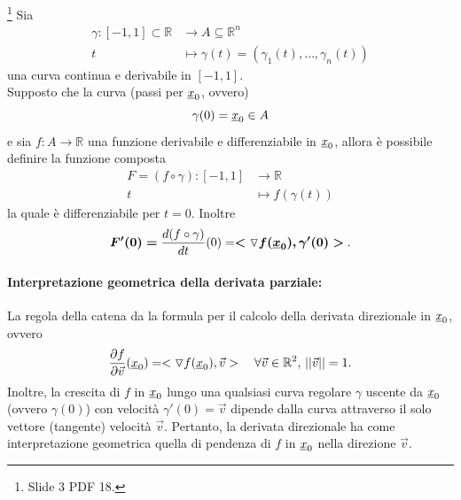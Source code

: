 \begin{theorem}\footnote{Slide 3 PDF 18.}
	Sia
	\begin{equation*}
		\begin{aligned}
			\gamma:[-1,1]\subset\mathbb{R} &\rightarrow A\subseteq\mathbb{R}^n\\
			t&\mapsto \gamma(t)=(\gamma_1(t),\hdots,\gamma_n(t)) 
		\end{aligned}
	\end{equation*}
	una curva continua e derivabile in $[-1,1]$.\\
	Supposto che la curva (passi per $\uline x_0$, ovvero)
	\begin{equation*}
		\gamma(0) = \uline x_0\in A
	\end{equation*}
	e sia $f:A\rightarrow\mathbb{R}$ una funzione derivabile e differenziabile in $\uline x_0$, allora è possibile definire la funzione composta
	\begin{equation*}
		\begin{aligned}
			F=(f \circ \gamma): [-1,1]&\rightarrow\mathbb{R}\\
			t&\mapsto f(\gamma(t))
		\end{aligned}
	\end{equation*}
	la quale è differenziabile per $t=0$. Inoltre
	\begin{equation*}
		\boldsymbol{F'(0)=}\frac{d(f\circ \gamma)}{dt}(0) = \boldsymbol{<\triangledown f(\uline x_0), \gamma'(0)>}.
	\end{equation*}
\end{theorem}

\paragraph{Interpretazione geometrica della derivata parziale:} La regola della catena da la formula per il calcolo della derivata direzionale in $\uline x_0$, ovvero
\begin{equation*}
	\frac{\partial f}{\partial \vec{v}} (\uline x_0)=<\triangledown f(\uline x_0), \vec{v}>\quad \forall\vec{v}\in\mathbb{R}^2,\, ||\vec{v}||=1.
\end{equation*}
Inoltre, la crescita di $f$ in $\uline x_0$ lungo una qualsiasi curva regolare $\gamma$ uscente da $\uline x_0$ (ovvero $\gamma(0)$) con velocità $\gamma'(0)=\vec{v}$ dipende dalla curva attraverso il solo vettore (tangente) velocità $\vec{v}$. Pertanto, la derivata direzionale ha come interpretazione geometrica quella di pendenza di $f$ in $\uline x_0$ nella direzione $\vec{v}$.

